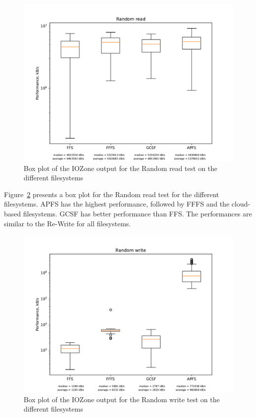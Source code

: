 \begin{figure}[!ht]
	\label{fig:res_box_rndread}
	\begin{center}
		\includegraphics[width=1.0\textwidth]{figures/benchmarking/Random read_box.pdf}
	\end{center}
	\caption{Box plot of the IOZone output for the Random read test on the different filesystems}
\end{figure}

\FloatBarrier

Figure~\ref{fig:res_box_rndwrite} presents a box plot for the Random read test for the different filesystems. \gls{APFS} has the highest performance, followed by \gls{FFFS} and the cloud-based filesystems. \gls{GCSF} has better performance than \gls{FFS}. The performances are similar to the \mbox{Re-Write} for all filesystems.

\begin{figure}[!ht]
	\label{fig:res_box_rndwrite}
	\begin{center}
		\includegraphics[width=1.0\textwidth]{figures/benchmarking/Random write_box.pdf}
	\end{center}
	\caption{Box plot of the IOZone output for the Random write test on the different filesystems}
\end{figure}

